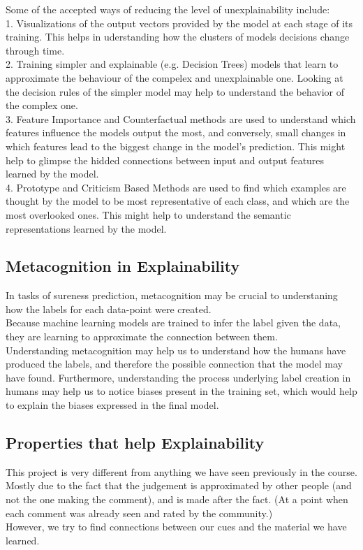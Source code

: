 \documentclass[11pt, oneside]{article}   	%
\begin{document}
Some of the accepted ways of reducing the level of unexplainability include:\\
1. Visualizations of the output vectors provided by the model at each stage of its training. This helps in uderstanding how the clusters of models decisions change through time.\\
2. Training simpler and explainable (e.g. Decision Trees) models that learn to approximate the behaviour of the compelex and unexplainable one. Looking at the decision rules of the simpler model may help to understand the behavior of the complex one.\\
3. Feature Importance and Counterfactual methods are used to understand which features influence the models output the most, and conversely, small changes in which features lead to the biggest change in the model's prediction. This might help to glimpse the hidded connections between input and output features learned by the model.\\
4. Prototype and Criticism Based Methods are used to find which examples are thought by the model to be most representative of each class, and which are the most overlooked ones. This might help to understand the semantic representations learned by the model.

\subsection{Metacognition in Explainability}
In tasks of sureness prediction, metacognition may be crucial to understaning how the labels for each data-point were created.\\

Because machine learning models are trained to infer the label given the data, they are learning to approximate the connection between them.\\
Understanding metacognition may help us to understand how the humans have produced the labels, and therefore the possible connection that the model may have found. Furthermore, understanding the process underlying label creation in humans may help us to notice biases present in the training set, which would help to explain the biases expressed in the final model.

\subsection{Properties that help Explainability}
This project is very different from anything we have seen previously in the course. Mostly due to the fact that the judgement is approximated by other people (and not the one making the comment), and is made after the fact. (At a point when each comment was already seen and rated by the community.)\\
However, we try to find connections between our cues and the material we have learned.\\
\end{document}
